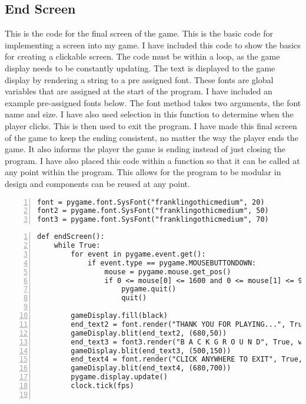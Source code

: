 \documentclass[12pt]{report}
\begin{document}
\subsection{End Screen}
This is the code for the final screen of the game. This is the basic code for implementing a screen into my game. I have included this code to show the basics for creating a clickable screen. The code must be within a loop, as the game display needs to be constantly updating. The text is displayed to the game display by rendering a string to a pre assigned font. These fonts are global variables that are assigned at the start of the program. I have included an example pre-assigned fonts below. The font method takes two arguments, the font name and size. I have also used selection in this function to determine when the player clicks. This is then used to exit the program. I have made this final screen of the game to keep the ending consistent, no matter the way the player ends the game. It also informs the player the game is ending instead of just closing the program. I have also placed this code within a function so that it can be called at any point within the program. This allows for the program to be modular in design and components can be reused at any point. 


\begin{Verbatim}[numbers=left, frame=single]
font = pygame.font.SysFont("franklingothicmedium", 20)
font2 = pygame.font.SysFont("franklingothicmedium", 50)
font3 = pygame.font.SysFont("franklingothicmedium", 70)
\end{Verbatim}

\small

\begin{Verbatim}[numbers=left, frame=single]
def endScreen():
    while True:
        for event in pygame.event.get():
            if event.type == pygame.MOUSEBUTTONDOWN:
                mouse = pygame.mouse.get_pos()
                if 0 <= mouse[0] <= 1600 and 0 <= mouse[1] <= 900:
                    pygame.quit()
                    quit()

        gameDisplay.fill(black)
        end_text2 = font.render("THANK YOU FOR PLAYING...", True, white)
        gameDisplay.blit(end_text2, (680,50))
        end_text3 = font3.render("B A C K G R O U N D", True, white)
        gameDisplay.blit(end_text3, (500,150))
        end_text4 = font.render("CLICK ANYWHERE TO EXIT", True, white)
        gameDisplay.blit(end_text4, (680,700))
        pygame.display.update()                                                                     
        clock.tick(fps)
     
\end{Verbatim}
\end{document}
